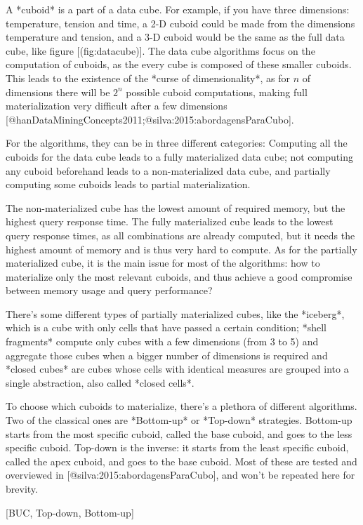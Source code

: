A *cuboid* is a part of a data cube. For example, if you have three dimensions: temperature, tension and time, a 2-D cuboid could be made from the dimensions temperature and tension, and a 3-D cuboid would be the same as the full data cube, like figure [\@ref(fig:datacube)].
The data cube algorithms focus on the computation of cuboids, as the every cube is composed of these smaller cuboids.
This leads to the existence of the *curse of dimensionality*, as for $n$ of dimensions there will be $2^n$ possible cuboid computations, making full materialization very difficult after a few dimensions [@hanDataMiningConcepts2011;@silva:2015:abordagensParaCubo].

For the algorithms, they can be in three different categories: Computing all the cuboids for the data cube leads to a fully materialized data cube; not computing any cuboid beforehand leads to a non-materialized data cube, and partially computing some cuboids leads to partial materialization.

The non-materialized cube has the lowest amount of required memory, but the highest query response time.
The fully materialized cube leads to the lowest query response times, as all combinations are already computed, but it needs the highest amount of memory and is thus very hard to compute.
As for the partially materialized cube, it is the main issue for most of the algorithms: how to materialize only the most relevant cuboids, and thus achieve a good compromise between memory usage and query performance?

There's some different types of partially materialized cubes, like the *iceberg*, which is a cube with only cells that have passed a certain condition; *shell fragments* compute only cubes with a few dimensions (from 3 to 5) and aggregate those cubes when a bigger number of dimensions is required and *closed cubes* are cubes whose cells with identical measures are grouped into a single abstraction, also called *closed cells*.

To choose which cuboids to materialize, there's a plethora of different algorithms.
Two of the classical ones are *Bottom-up* or *Top-down* strategies.
Bottom-up starts from the most specific cuboid, called the base cuboid, and goes to the less specific cuboid.
Top-down is the inverse: it starts from the least specific cuboid, called the apex cuboid, and goes to the base cuboid.
Most of these are tested and overviewed in [@silva:2015:abordagensParaCubo], and won't be repeated here for brevity.

[BUC, Top-down, Bottom-up]

